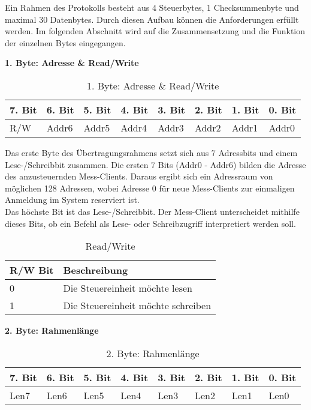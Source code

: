 Ein Rahmen des Protokolls besteht aus 4 Steuerbytes, 1 Checksummenbyte und maximal 30 Datenbytes. Durch diesen Aufbau können die Anforderungen erfüllt werden. Im folgenden Abschnitt wird auf die Zusammensetzung und die Funktion der einzelnen Bytes eingegangen.


\textbf{1. Byte: Adresse \& Read/Write}

\begin{table}[H]
\begin{center}
\begin{tabularx}{\textwidth}{|X|X|X|X|X|X|X|X|}\hline
 7. Bit & 6. Bit & 5. Bit & 4. Bit & 3. Bit & 2. Bit & 1. Bit & 0. Bit\\ \hline
 R/W & Addr6 & Addr5 & Addr4 & Addr3 & Addr2 & Addr1 & Addr0\\ \hline
\end{tabularx}
\caption{1. Byte: Adresse \& Read/Write}
\label{table_1Byte}
\end{center}
\end{table}

Das erste Byte des Übertragungsrahmens setzt sich aus 7 Adressbits und einem Lese-/Schreibbit zusammen. Die ersten 7 Bits (Addr0 - Addr6) bilden die Adresse des anzusteuernden Mess-Clients. Daraus ergibt sich ein Adressraum von möglichen 128 Adressen, wobei Adresse 0 für neue Mess-Clients zur einmaligen Anmeldung im System reserviert ist.\\
Das höchste Bit ist das Lese-/Schreibbit. Der Mess-Client unterscheidet mithilfe dieses Bits, ob ein Befehl als Lese- oder Schreibzugriff interpretiert werden soll.\\

\begin{table}[H]
\begin{center}
\begin{tabular}{|l|l|}\hline
 R/W Bit & Beschreibung \\ \hline
 0 & Die Steuereinheit möchte lesen \\ \hline
 1 & Die Steuereinheit möchte schreiben \\ \hline
\end{tabular}
\caption{Read/Write}
\label{table_RW}
\end{center}
\end{table}


\textbf{2. Byte: Rahmenlänge}

\begin{table}[H]
\begin{center}
\begin{tabularx}{\textwidth}{|X|X|X|X|X|X|X|X|}\hline
 7. Bit & 6. Bit & 5. Bit & 4. Bit & 3. Bit & 2. Bit & 1. Bit & 0. Bit\\ \hline
 Len7 & Len6 & Len5 & Len4 & Len3 & Len2 & Len1 & Len0\\ \hline
\end{tabularx}
\caption{2. Byte: Rahmenlänge}
\label{table_2Byte}
\end{center}
\end{table}

